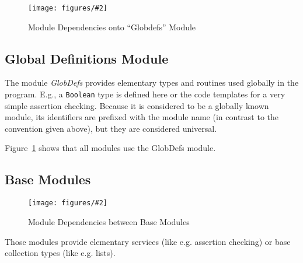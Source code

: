 \documentclass[10pt]{article}
\newcommand{\centeredExternalPicture}[2][]{%
  \begin{center}
    \texttt{[image: figures/\#2]}%
  \end{center}
}
\newcommand{\code}[1]{{\lstset{basicstyle=\normalsize\ttfamily}\lstinline!#1!}}
\newcommand{\definition}[1]{\emph{#1}}
\newcommand{\generalDependencyFigure}[3]{%
  \begin{figure}[th]
    \centeredExternalPicture[width=\textwidth]{linkerFigures-#1.mps}
    \caption{#3}
    \label{#2}
  \end{figure}
}
\begin{document}
\generalDependencyFigure{2}{figure:module_overview_globdefs}
                           {Module Dependencies onto ``Globdefs'' Module}

\subsection{Global Definitions Module}

The module \definition{GlobDefs} provides elementary types and
routines used globally in the program.  E.g., a \code{Boolean} type is
defined here or the code templates for a very simple assertion
checking.  Because it is considered to be a globally known module, its
identifiers are  prefixed with the module name (in
contrast to the convention given above), but they are considered
universal.

Figure~\ref{figure:module_overview_globdefs} shows that all modules
use the GlobDefs module.




\subsection{Base Modules}

\generalDependencyFigure{3}{figure:module_overview_base}
                           {Module Dependencies between Base Modules}

Those modules provide elementary services (like e.g. assertion
checking) or base collection types (like e.g. lists).
\end{document}
